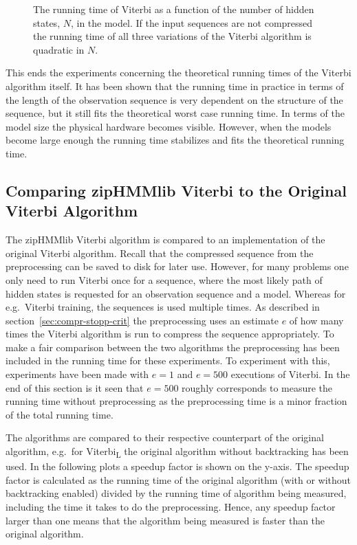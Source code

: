\begin{figure}
  \centering
  
  \caption{The running time of Viterbi as a function of the number of hidden
    states, $N$, in the model. If the input sequences are not compressed the
    running time of all three variations of the Viterbi algorithm is quadratic
    in $N$.}
  \label{fig:assymptotic_viterbi_N}
\end{figure}

This ends the experiments concerning the theoretical running times of the
Viterbi algorithm itself. It has been shown that the running time in practice
in terms of the length of the observation sequence is very dependent on the
structure of the sequence, but it still fits the theoretical worst case running time. In
terms of the model size the physical hardware becomes visible. However, when
the models become large enough the running time stabilizes and fits the theoretical
running time.

\subsection{Comparing zipHMMlib Viterbi to the Original Viterbi Algorithm}
\label{sec:comp-ziphmml-viterbi}

The zipHMMlib Viterbi algorithm is compared to an implementation of the
original Viterbi algorithm. Recall that the compressed sequence from the
preprocessing can be saved to disk for later use. However, for many problems
one only need to run Viterbi once for a sequence, where the most likely path of
hidden states is requested for an observation sequence and a model. Whereas for
e.g.\ Viterbi training, the sequences is used multiple times. As described in
section~\ref{sec:compr-stopp-crit} the preprocessing uses an estimate $e$ of
how many times the Viterbi algorithm is run to compress the sequence
appropriately. To make a fair comparison between the two algorithms the
preprocessing has been included in the running time for these experiments. To
experiment with this, experiments have been made with $e = 1$ and $e = 500$
executions of Viterbi. In the end of this section is it seen that $e = 500$
roughly corresponds to measure the running time without preprocessing as the
preprocessing time is a minor fraction of the total running time.

The algorithms are compared to their respective counterpart of the original
algorithm, e.g.\ for Viterbi\textsubscript{L} the original
algorithm without backtracking has been used. In the following plots a
speedup factor is shown on the y-axis. The speedup factor is calculated as
the running time of the original algorithm (with or without backtracking
enabled) divided by the running time of algorithm being measured, including the
time it takes to do the preprocessing. Hence, any speedup factor larger than one
means that the algorithm being measured is faster than the original algorithm.

